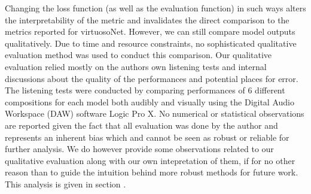 Changing the loss function (as well as the evaluation function) in such ways alters the interpretability of the metric and invalidates the direct comparison to the metrics reported for virtuosoNet. However, we can still compare model outputs qualitatively. Due to time and resource constraints, no sophisticated qualitative evaluation method was used to conduct this comparison. Our qualitative evaluation relied mostly on the authors own listening tests and internal discussions about the quality of the performances and potential places for error. The listening tests were conducted by comparing performances of 6 different compositions for each model both audibly and visually using the Digital Audio Workspace (DAW) software Logic Pro X. No numerical or statistical observations are reported given the fact that all evaluation was done by the author and represents an inherent bias which and cannot be seen as robust or reliable for further analysis. We do however provide some observations related to our qualitative evaluation along with our own intepretation of them, if for no other reason than to guide the intuition behind more robust methods for future work. This analysis is given in section . 

